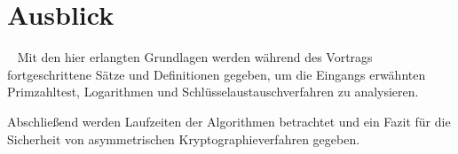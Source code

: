 \section*{Ausblick}~\label{Kapitel Fazit}
	Mit den hier erlangten Grundlagen werden während des Vortrags fortgeschrittene Sätze und Definitionen gegeben, um die Eingangs erwähnten Primzahltest, Logarithmen und Schlüsselaustauschverfahren zu analysieren.

	\wup Abschließend werden Laufzeiten der Algorithmen betrachtet und ein Fazit für die Sicherheit von asymmetrischen Kryptographieverfahren gegeben.